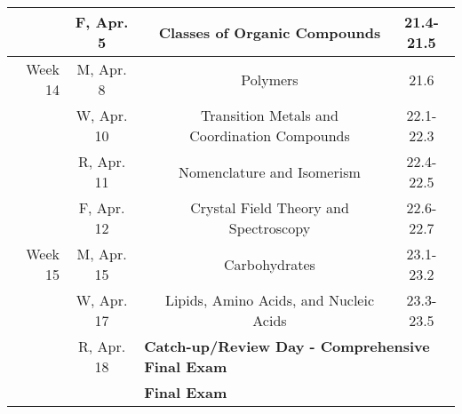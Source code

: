 \begin{tabular}{rcccc}
& F, Apr. 5&& Classes of Organic Compounds & 21.4-21.5\\
\midrule
Week 14 & M, Apr. 8&& Polymers & 21.6\\
& W, Apr. 10&& Transition Metals and Coordination Compounds & 22.1-22.3\\
& R, Apr. 11&& Nomenclature and Isomerism & 22.4-22.5\\
& F, Apr. 12&& Crystal Field Theory and Spectroscopy & 22.6-22.7\\
\midrule
Week 15 & M, Apr. 15&& Carbohydrates & 23.1-23.2\\
& W, Apr. 17&& Lipids, Amino Acids, and Nucleic Acids & 23.3-23.5\\
& R, Apr. 18& \multicolumn{3}{l}{\textbf{Catch-up/Review Day - Comprehensive Final Exam}}\\
\midrule
\midrule
& & \multicolumn{3}{l}{\textbf{Final Exam}}\\
\end{tabular}